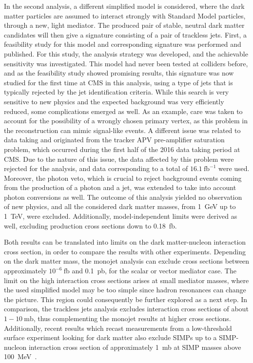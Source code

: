 In the second analysis, a different simplified model is considered, where the dark matter particles are assumed to interact strongly with Standard Model particles, through a new, light mediator. The produced pair of stable, neutral dark matter candidates will then give a signature consisting of a pair of trackless jets. First, a feasibility study for this model and corresponding signature was performed and published. For this study, the analysis strategy was developed, and the achievable sensitivity was investigated. This model had never been tested at colliders before, and as the feasibility study showed promising results, this signature was now studied for the first time at \ac{CMS} in this analysis, using a type of jets that is typically rejected by the jet identification criteria. While this search is very sensitive to new physics and the expected background was very efficiently reduced, some complications emerged as well. As an example, care was taken to account for the possibility of a wrongly chosen primary vertex, as this problem in the reconstruction can mimic signal-like events. A different issue was related to data taking and originated from the tracker APV pre-amplifier saturation problem, which occurred during the first half of the 2016 data taking period at \ac{CMS}. Due to the nature of this issue, the data affected by this problem were rejected for the analysis, and data corresponding to a total of $16.1\ \mathrm{fb}^{-1}$ were used. Moreover, the photon veto, which is crucial to reject background events coming from the production of a photon and a jet, was extended to take into account photon conversions as well. The outcome of this analysis yielded no observation of new physics, and all the considered dark matter masses, from \SI{1}{GeV} up to \SI{1}{TeV}, were excluded. Additionally, model-independent limits were derived as well, excluding production cross sections down to \SI{0.18}{fb}.

Both results can be translated into limits on the dark matter-nucleon interaction cross section, in order to compare the results with other experiments. Depending on the dark matter mass, the monojet analysis can exclude cross sections between approximately $10^{-6}\ \mathrm{fb}$ and \SI{0.1}{pb}, for the scalar or vector mediator case. The limit on the high interaction cross sections arises at small mediator masses, where the used simplified model may be too simple since hadron resonances can change the picture. This region could consequently be further explored as a next step. In comparison, the trackless jets analysis excludes interaction cross sections of about $1-10\ \mathrm{mb}$, thus complementing the monojet results at higher cross sections. Additionally, recent results which recast measurements from a low-threshold surface experiment looking for dark matter also exclude \acp{SIMP} up to a \ac{SIMP}-nucleon interaction cross section of approximately \SI{1}{mb} at \ac{SIMP} masses above \SI{100}{MeV}~\cite{Davis:2017noy}.

